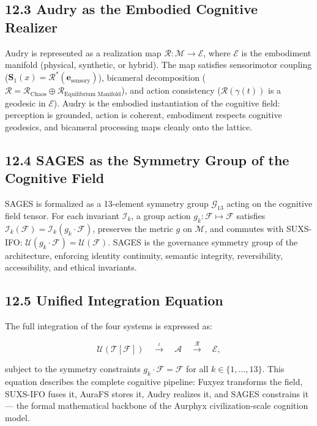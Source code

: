 \subsection{12.3 Audry as the Embodied Cognitive Realizer}\label{audry-as-the-embodied-cognitive-realizer}

Audry is represented as a realization map \(\mathcal{R} : \mathcal{M} \rightarrow \mathcal{E}\), where \(\mathcal{E}\) is the embodiment manifold (physical, synthetic, or hybrid). The map satisfies sensorimotor coupling (\(\mathbf{S}_1(x) = \mathcal{R}^{\ast}(\mathbf{e}_{\mathrm{sensory}})\)), bicameral decomposition (\(\mathcal{R} = \mathcal{R}_{\text{Chaos}} \oplus \mathcal{R}_{\text{Equilibrium Manifold}}\)), and action consistency (\(\mathcal{R}(\gamma(t))\) is a geodesic in \(\mathcal{E}\)). Audry is the embodied instantiation of the cognitive field: perception is grounded, action is coherent, embodiment respects cognitive geodesics, and bicameral processing maps cleanly onto the lattice.

\subsection{12.4 SAGES as the Symmetry Group of the Cognitive Field}\label{sages-as-the-symmetry-group-of-the-cognitive-field}

SAGES is formalized as a 13-element symmetry group \(\mathcal{G}_{13}\) acting on the cognitive field tensor. For each invariant \(\mathcal{I}_k\), a group action \(g_k : \mathcal{F} \mapsto \mathcal{F}\) satisfies \(\mathcal{I}_k(\mathcal{F}) = \mathcal{I}_k(g_k \cdot \mathcal{F})\), preserves the metric \(g\) on \(\mathcal{M}\), and commutes with SUXS-IFO: \(\mathcal{U}(g_k \cdot \mathcal{F}) = \mathcal{U}(\mathcal{F})\). SAGES is the governance symmetry group of the architecture, enforcing identity continuity, semantic integrity, reversibility, accessibility, and ethical invariants.

\subsection{12.5 Unified Integration Equation}\label{unified-integration-equation}

The full integration of the four systems is expressed as:

\[
\mathcal{U} \left( \mathcal{T}[\mathcal{F}] \right)
\quad \xrightarrow{\iota}
\quad \mathcal{A}
\quad \xrightarrow{\mathcal{R}}
\quad \mathcal{E},
\]

subject to the symmetry constraints \(g_k \cdot \mathcal{F} = \mathcal{F}\) for all \(k \in \{1,\dots,13\}\). This equation describes the complete cognitive pipeline: Fuxyez transforms the field, SUXS-IFO fuses it, AuraFS stores it, Audry realizes it, and SAGES constrains it --- the formal mathematical backbone of the Aurphyx civilization-scale cognition model.

